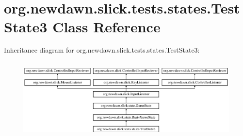 \hypertarget{classorg_1_1newdawn_1_1slick_1_1tests_1_1states_1_1_test_state3}{}\section{org.\+newdawn.\+slick.\+tests.\+states.\+Test\+State3 Class Reference}
\label{classorg_1_1newdawn_1_1slick_1_1tests_1_1states_1_1_test_state3}
Inheritance diagram for org.\+newdawn.\+slick.\+tests.\+states.\+Test\+State3\+:\begin{figure}[H]
\begin{center}
\leavevmode
\includegraphics[height=4.226415cm]{classorg_1_1newdawn_1_1slick_1_1tests_1_1states_1_1_test_state3}
\end{center}
\end{figure}
